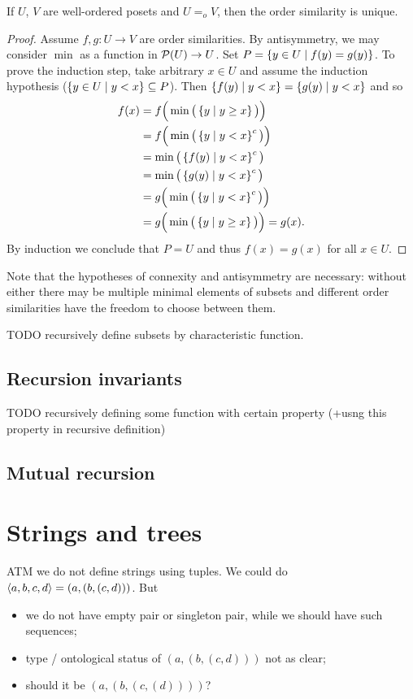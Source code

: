 \begin{corollary} \label{WOSetsUniqueSimilarity}
If $U$, $V$ are well-ordered posets and $U =_o V$, then the order similarity is unique.
\end{corollary}
\begin{proof}
Assume $f,g: U\to V$ are order similarities. By antisymmetry, we may consider $\min$ as a function in $\operatorname{\mathcal{P}}(U)\to U$. Set $P = \left\{ y\in U \;\middle|\; f(y) = g(y) \right\}$. To prove the induction step, take arbitrary $x\in U$ and assume the induction hypothesis ($\left\{ y\in U \;\middle|\; y<x \right\} \subseteq P$). Then $\left\{ f(y) \;\middle|\; y< x \right\} = \left\{ g(y) \;\middle|\; y< x \right\}$ and so
\begin{align*}
f(x) &= f\Big(\min\big(\left\{ y \;\middle|\; y\geq x \right\}\big)\Big) \\
&= f\Big(\min\big(\left\{ y \;\middle|\; y < x \right\}^c\big)\Big) \\
&= \min\big(\left\{ f(y) \;\middle|\; y< x \right\}^c\big) \\
&= \min\big(\left\{ g(y) \;\middle|\; y< x \right\}^c\big) \\
&= g\Big(\min\big(\left\{ y \;\middle|\; y < x \right\}^c\big)\Big) \\
&= g\Big(\min\big(\left\{ y \;\middle|\; y\geq x \right\}\big)\Big) = g(x).
\end{align*}
By induction we conclude that $P=U$ and thus $f(x) = g(x)$ for all $x\in U$.
\end{proof}

Note that the hypotheses of connexity and antisymmetry are necessary: without either there may be multiple minimal elements of subsets and different order similarities have the freedom to choose between them.


TODO recursively define subsets by characteristic function.

\subsection{Recursion invariants}
TODO recursively defining some function with certain property (+usng this property in recursive definition)

\subsection{Mutual recursion}

\section{Strings and trees}
ATM we do not define strings using tuples. We could do $\left\langle a,b,c,d \right\rangle = (a, (b,(c,d)))$. But
\begin{itemize}
\item we do not have empty pair or singleton pair, while we should have such sequences;
\item type / ontological status of $(a, (b,(c,d)))$ not as clear;
\item should it be $(a, (b,(c,(d))))$?
\end{itemize}


